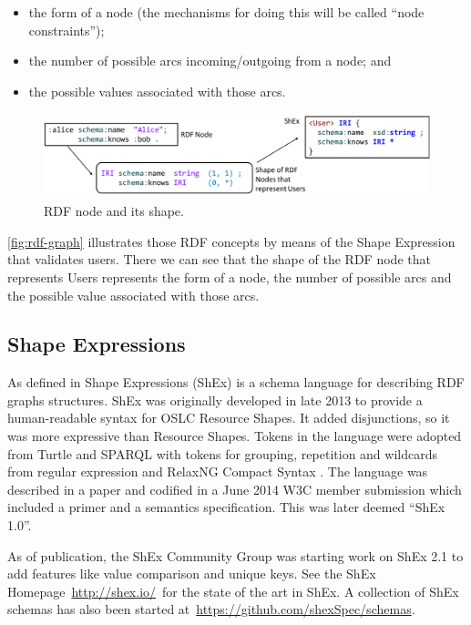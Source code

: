 \begin{itemize}
 \item the form of a node (the mechanisms for doing this will be called “node constraints”);
 \item the number of possible arcs incoming/outgoing from a node; and
 \item the possible values associated with those arcs.
\end{itemize}

\begin{figure}
  \includegraphics[scale=0.25]{images/rdf-node-and-shape.png}
  \centering
  \caption[RDF node and its shape]{RDF node and its shape.}
  \label{fig:rdf-graph-2}
\end{figure}

\cref{fig:rdf-graph} illustrates those RDF concepts by means of the Shape Expression that validates users.
There we can see that the shape of the RDF node that represents Users represents the form of a node,
the number of possible arcs and the possible value associated with those arcs.

\subsection{Shape Expressions}
As defined in \cite{labra-validating-rdf} Shape Expressions (ShEx) is a schema language for describing RDF
graphs structures. ShEx was originally developed in late 2013 to provide a human-readable syntax for OSLC
Resource Shapes. It added disjunctions, so it was more expressive than Resource Shapes. Tokens in the language
were adopted from Turtle and SPARQL with tokens for grouping, repetition and wildcards from regular expression
and RelaxNG Compact Syntax \cite{van2003relax}. The language was described in a paper
\cite{eric-rdf-validation-lang} and codified in a June 2014 W3C member submission which included a primer and
a semantics specification. This was later deemed “ShEx 1.0”.

As of publication, the ShEx Community Group was starting work on ShEx 2.1 to add features like value comparison
and unique keys. See the ShEx Homepage \url{http://shex.io/} for the state of the art in ShEx. A collection of
ShEx schemas has also been started at \url{https://github.com/shexSpec/schemas}.

